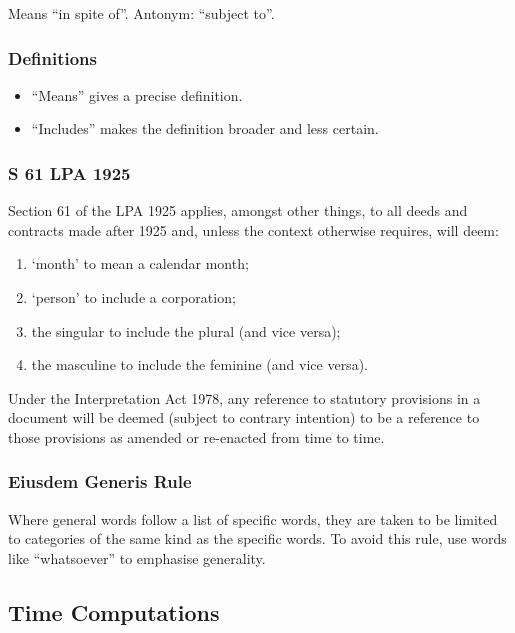 \documentclass[
]{article}
\providecommand{\tightlist}{%
  \setlength{\itemsep}{0pt}\setlength{\parskip}{0pt}}
\begin{document}
Means ``in spite of''. Antonym: ``subject to''.

\hypertarget{definitions}{%
\subsubsection{Definitions}\label{definitions}}

\begin{itemize}
\tightlist
\item
  ``Means'' gives a precise definition.
\item
  ``Includes'' makes the definition broader and less certain.
\end{itemize}

\hypertarget{s-61-lpa-1925}{%
\subsubsection{S 61 LPA 1925}\label{s-61-lpa-1925}}

Section 61 of the LPA 1925 applies, amongst other things, to all deeds
and contracts made after 1925 and, unless the context otherwise
requires, will deem:

\begin{enumerate}
\tightlist
\item
  `month' to mean a calendar month;
\item
  `person' to include a corporation;
\item
  the singular to include the plural (and vice versa);
\item
  the masculine to include the feminine (and vice versa).
\end{enumerate}

Under the Interpretation Act 1978, any reference to statutory provisions
in a document will be deemed (subject to contrary intention) to be a
reference to those provisions as amended or re-enacted from time to
time.

\hypertarget{eiusdem-generis-rule}{%
\subsubsection{Eiusdem Generis Rule}\label{eiusdem-generis-rule}}

Where general words follow a list of specific words, they are taken to
be limited to categories of the same kind as the specific words. To
avoid this rule, use words like ``whatsoever'' to emphasise generality.

\hypertarget{time-computations}{%
\subsection{Time Computations}\label{time-computations}}
\end{document}
